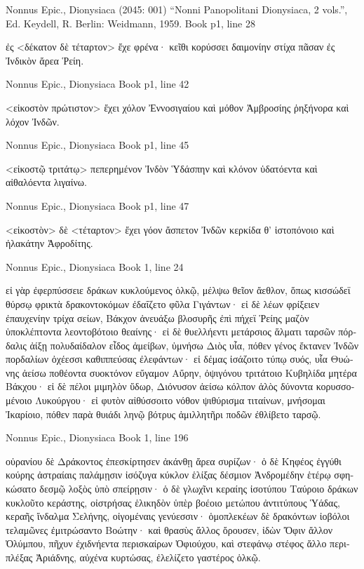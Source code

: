 \documentclass[12pt,letterpaper,twoside,final]{memoir}
\begin{document}
\begin{greek}
Nonnus Epic., Dionysiaca (2045: 001)
“Nonni Panopolitani Dionysiaca, 2 vols.”, Ed. Keydell, R.
Berlin: Weidmann, 1959.
Book p1, line 28

ἐς <δέκατον δὲ τέταρτον> ἔχε φρένα· κεῖθι κορύσσει 
δαιμονίην στίχα πᾶσαν ἐς Ἰνδικὸν ἄρεα Ῥείη. 



Nonnus Epic., Dionysiaca 
Book p1, line 42

<εἰκοστὸν πρώτιστον> ἔχει χόλον Ἐννοσιγαίου 
καὶ μόθον Ἀμβροσίης ῥηξήνορα καὶ λόχον Ἰνδῶν. 



Nonnus Epic., Dionysiaca 
Book p1, line 45

<εἰκοστῷ τριτάτῳ> πεπερημένον Ἰνδὸν Ὑδάσπην 
καὶ κλόνον ὑδατόεντα καὶ αἰθαλόεντα λιγαίνω. 



Nonnus Epic., Dionysiaca 
Book p1, line 47

<εἰκοστὸν> δὲ <τέταρτον> ἔχει γόον ἄσπετον Ἰνδῶν 
κερκίδα θ' ἱστοπόνοιο καὶ ἠλακάτην Ἀφροδίτης. 



Nonnus Epic., Dionysiaca 
Book 1, line 24

εἰ γὰρ ἐφερπύσσειε δράκων κυκλούμενος ὁλκῷ, 
μέλψω θεῖον ἄεθλον, ὅπως κισσώδεϊ θύρσῳ 
φρικτὰ δρακοντοκόμων ἐδαΐζετο φῦλα Γιγάντων· 
εἰ δὲ λέων φρίξειεν ἐπαυχενίην τρίχα σείων, 
Βάκχον ἀνευάξω βλοσυρῆς ἐπὶ πήχεϊ Ῥείης 
μαζὸν ὑποκλέπτοντα λεοντοβότοιο θεαίνης· 
εἰ δὲ θυελλήεντι μετάρσιος ἅλματι ταρσῶν 
πόρδαλις ἀίξῃ πολυδαίδαλον εἶδος ἀμείβων, 
ὑμνήσω Διὸς υἷα, πόθεν γένος ἔκτανεν Ἰνδῶν 
πορδαλίων ὀχέεσσι καθιππεύσας ἐλεφάντων· 
εἰ δέμας ἰσάζοιτο τύπῳ συός, υἷα Θυώνης   
ἀείσω ποθέοντα συοκτόνον εὔγαμον Αὔρην, 
ὀψιγόνου τριτάτοιο Κυβηλίδα μητέρα Βάκχου· 
εἰ δὲ πέλοι μιμηλὸν ὕδωρ, Διόνυσον ἀείσω 
κόλπον ἁλὸς δύνοντα κορυσσομένοιο Λυκούργου· 
εἰ φυτὸν αἰθύσσοιτο νόθον ψιθύρισμα τιταίνων, 
μνήσομαι Ἰκαρίοιο, πόθεν παρὰ θυιάδι ληνῷ 
βότρυς ἁμιλλητῆρι ποδῶν ἐθλίβετο ταρσῷ. 



Nonnus Epic., Dionysiaca 
Book 1, line 196

οὐρανίου δὲ Δράκοντος ἐπεσκίρτησεν ἀκάνθῃ 
ἄρεα συρίζων· ὁ δὲ Κηφέος ἐγγύθι κούρης 
ἀστραίαις παλάμῃσιν ἰσόζυγα κύκλον ἑλίξας 
δέσμιον Ἀνδρομέδην ἑτέρῳ σφηκώσατο δεσμῷ 
λοξὸς ὑπὸ σπείρῃσιν· ὁ δὲ γλωχῖνι κεραίης 
ἰσοτύπου Ταύροιο δράκων κυκλοῦτο κεράστης, 
οἰστρήσας ἑλικηδὸν ὑπὲρ βοέοιο μετώπου 
ἀντιτύπους Ὑάδας, κεραῆς ἴνδαλμα Σελήνης, 
οἰγομέναις γενύεσσιν· ὁμοπλεκέων δὲ δρακόντων 
ἰοβόλοι τελαμῶνες ἐμιτρώσαντο Βοώτην· 
καὶ θρασὺς ἄλλος ὄρουσεν, ἰδὼν Ὄφιν ἄλλον Ὀλύμπου, 
πῆχυν ἐχιδνήεντα περισκαίρων Ὀφιούχου, 
καὶ στεφάνῳ στέφος ἄλλο περιπλέξας Ἀριάδνης, 
αὐχένα κυρτώσας, ἐλελίζετο γαστέρος ὁλκῷ. 




\end{greek}
\end{document}
